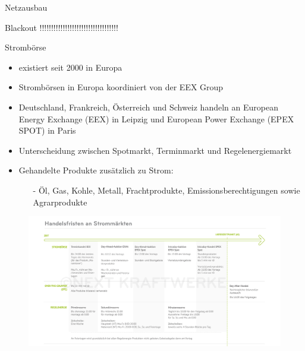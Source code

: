 \documentclass[aspectratio=1610, professionalfonts, 9pt]{beamer}
\begin{document}
\begin{frame}{Netzausbau}

\end{frame}
\begin{frame}{Blackout}
!!!!!!!!!!!!!!!!!!!!!!!!!!!!!!!!!!
\end{frame}




\begin{frame}{Strombörse}
\begin{itemize}
  \item existiert seit \num{2000} in Europa
  \item Strombörsen in Europa koordiniert von der EEX Group
  \item Deutschland, Frankreich, Österreich
  und Schweiz handeln an European Energy Exchange (EEX) in Leipzig
 und European Power Exchange (EPEX SPOT) in Paris
 \item Unterscheidung zwischen Spotmarkt, Terminmarkt und Regelenergiemarkt
\item Gehandelte Produkte zusätzlich zu Strom:
    \begin{itemize}
      \item[-]Öl, Gas, Kohle, Metall, Frachtprodukte,
       Emissionsberechtigungen sowie Agrarprodukte
    \end{itemize}
\end{itemize}
\end{frame}


{
\begin{frame}
  \begin{figure}
  \includegraphics[width=1.1\textwidth]{images/stromprodukte.jpg}
\end{figure}
\end{frame}
}
\end{document}
